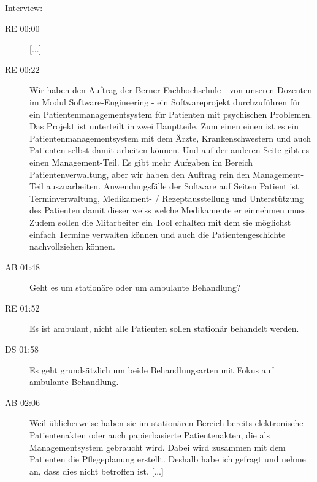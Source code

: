 \documentclass[a4paper]{scrartcl}
\begin{document}
Interview:
\begin{description}
\item[RE 00:00] [...]
\item[RE 00:22] Wir haben den Auftrag der Berner Fachhochschule - von unseren Dozenten im Modul Software-Engineering - ein Softwareprojekt durchzuführen für ein Patientenmanagementsystem für Patienten mit psychischen Problemen. Das Projekt ist unterteilt in zwei Hauptteile. Zum einen einen ist es ein Patientenmanagementsystem mit dem Ärzte, Krankenschwestern und auch Patienten selbst damit arbeiten können. Und auf der anderen Seite gibt es einen Management-Teil. Es gibt mehr Aufgaben im Bereich Patientenverwaltung, aber wir haben den Auftrag rein den Management-Teil auszuarbeiten. Anwendungsfälle der Software auf Seiten Patient ist Terminverwaltung, Medikament- / Rezeptausstellung und Unterstützung des Patienten damit dieser weiss welche Medikamente er einnehmen  muss. Zudem sollen die Mitarbeiter ein Tool erhalten mit dem sie möglichst einfach Termine verwalten können und auch die Patientengeschichte nachvollziehen können.
\item[AB 01:48] Geht es um stationäre oder um ambulante Behandlung?
\item[RE 01:52] Es ist ambulant, nicht alle Patienten sollen stationär behandelt werden.
\item[DS 01:58] Es geht grundsätzlich um beide Behandlungsarten mit Fokus auf ambulante Behandlung.
\item[AB 02:06] Weil üblicherweise haben sie im stationären Bereich bereits elektronische	Patientenakten oder auch papierbasierte Patientenakten, die als Managementsystem gebraucht wird. Dabei wird zusammen mit dem Patienten die Pflegeplanung erstellt. Deshalb habe ich gefragt und nehme an, dass dies nicht betroffen ist. [...]




\end{description}
\end{document}
